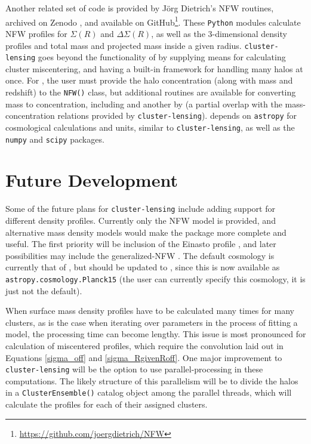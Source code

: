 \documentclass[twocolumn]{aastex6}
\newcommand{\code}{\lstinline[style=codeintext]}
\begin{document}
Another related set of code is provided by J\"{o}rg Dietrich's NFW routines, archived on Zenodo \citep{DietrichNFW}, and available on GitHub\footnote{\url{https://github.com/joergdietrich/NFW}}. These \code{Python} modules calculate NFW profiles for $\Sigma(R)$ and $\Delta\Sigma(R)$, as well as the 3-dimensional density profiles and total mass and projected mass inside a given radius. \code{cluster-lensing} goes beyond the functionality of \citet{DietrichNFW} by supplying means for calculating cluster miscentering, and having a built-in framework for handling many halos at once. For \citet{DietrichNFW}, the user must provide the halo concentration (along with mass and redshift) to the \code{NFW()} class, but additional routines are available for converting mass to concentration, including \citet{Duffy08} and another by \citet{Dolag04} (a partial overlap with the mass-concentration relations provided by \code{cluster-lensing}). \citet{DietrichNFW} depends on \code{astropy} for cosmological calculations and units, similar to \code{cluster-lensing}, as well as the \code{numpy} and \code{scipy} packages.


\section{Future Development}
\label{future}

Some of the future plans for \code{cluster-lensing} include adding support for different density profiles. Currently only the NFW model is provided, and alternative mass density models would make the package more complete and useful. The first priority will be inclusion of the Einasto profile \citep{Einasto65}, and later possibilities may include the generalized-NFW \citep{Zhao96}. The default cosmology is currently that of \citet{PlanckXVI}, but should be updated to \citet{PlanckXIII_15}, since this is now available as \code{astropy.cosmology.Planck15} (the user can currently specify this cosmology, it is just not the default).

When surface mass density profiles have to be calculated many times for many clusters, as is the case when iterating over parameters in the process of fitting a model, the processing time can become lengthy. This issue is most pronounced for calculation of miscentered profiles, which require the convolution laid out in Equations \ref{sigma_off} and \ref{sigma_RgivenRoff}. One major improvement to \code{cluster-lensing} will be the option to use parallel-processing in these computations. The likely structure of this parallelism will be to divide the halos in a \code{ClusterEnsemble()} catalog object among the parallel threads, which will calculate the profiles for each of their assigned clusters.
\end{document}
